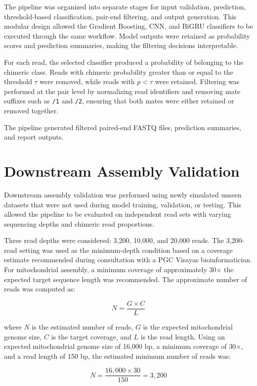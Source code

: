 The pipeline was organized into separate stages for input validation, prediction, threshold-based classification, pair-end filtering, and output generation. This modular design allowed the Gradient Boosting, CNN, and BiGRU classifiers to be executed through the same workflow. Model outputs were retained as probability scores and prediction summaries, making the filtering decisions interpretable.

For each read, the selected classifier produced a probability of belonging to the chimeric class. Reads with chimeric probability greater than or equal to the threshold \(\tau\) were removed, while reads with \(p < \tau\) were retained. Filtering was performed at the pair level by normalizing read identifiers and removing mate suffixes such as \texttt{/1} and \texttt{/2}, ensuring that both mates were either retained or removed together.

The pipeline generated filtered paired-end FASTQ files, prediction summaries, and report outputs.

\section{Downstream Assembly Validation}

Downstream assembly validation was performed using newly simulated unseen datasets that were not used during model training, validation, or testing. This allowed the pipeline to be evaluated on independent read sets with varying sequencing depths and chimeric read proportions.

Three read depths were considered: 3{,}200, 10{,}000, and 20{,}000 reads. The 3{,}200-read setting was used as the minimum-depth condition based on a coverage estimate recommended during consultation with a PGC Visayas bioinformatician. For mitochondrial assembly, a minimum coverage of approximately 30\(\times\) the expected target sequence length was recommended. The approximate number of reads was computed as:

\[
N = \frac{G \times C}{L}
\]

where \(N\) is the estimated number of reads, \(G\) is the expected mitochondrial genome size, \(C\) is the target coverage, and \(L\) is the read length. Using an expected mitochondrial genome size of 16{,}000 bp, a minimum coverage of 30\(\times\), and a read length of 150 bp, the estimated minimum number of reads was:

\[
N = \frac{16{,}000 \times 30}{150} = 3{,}200
\]

